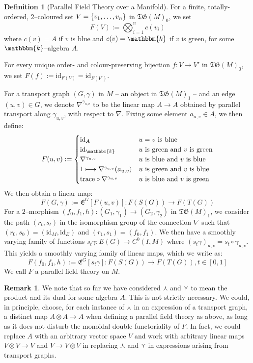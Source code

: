 \documentclass{amsart}
\newcommand{\K}{\mathbbm{k}}
\newcommand{\tensor}{\otimes}
\newcommand{\cwedge}{\curlywedge}
\newcommand{\cvee}{\curlyvee}
\renewcommand{\to}[1][]{\stackrel{#1}{\longrightarrow}}
\renewcommand{\mapsto}{\longmapsto}
\newcommand{\id}{\text{id}}
\newcommand{\br}[1]{\left( #1 \right)}
\newcommand{\curly}[1]{\left\{ #1 \right\}}
\newcommand{\set}[2][]{\ifthenelse{\equal{#1}{}}
                                  {\curly{#2}}
                                  {\curly{#1\ \textbf{:}\ #2}}}
\newcommand{\TG}{\mathfrak{TG}}
\newcommand{\Exp}[1]{\mathfrak{E}^{#1}}
\numberwithin{thm}{section}
\theoremstyle{definition}
\newtheorem{defn}[thm]{Definition}
\newtheorem{rmk}[thm]{Remark}
\begin{document}
\begin{defn}[Parallel Field Theory over a Manifold]\label{defn:sing_man_tqft}
For a finite, totally-ordered, $2$--coloured set
$V = \set{v_1, \dots, v_n}$ in $\TG(M)_0$, we set
\[
  F(V) := \bigotimes_{i = 1}^{n} c(v_i)
\]
where $c(v) = A$ if $v$ is blue and $c(v) = \K$ if $v$ is green,
for some $\K$--algebra $A$.

For every unique order- and colour-preserving bijection $f : V \to V'$ in
$\TG(M)_0$, we set $F(f) := \id_{F(V)} = \id_{F(V')}$.

For a transport graph $(G, \gamma)$ in $M$ -- an object in $\TG(M)_1$ -- and an
edge $(u, v) \in G$, we denote $\nabla^{\gamma_{u, v}}$ to be the linear map
$A \to A$ obtained by parallel transport along $\gamma_{u, v}$, with respect to
$\nabla$. Fixing some element $a_{u, v} \in A$, we then define:
\[
  F(u, v) := \begin{cases}
    \id_A
      & u = v \text{ is blue} \\
    \id_{\K} %
      & u \text{ is green and } v \text{ is green} \\
    \nabla^{\gamma_{u, v}}
      & u \text{ is blue and } v \text{ is blue} \\
    1 \mapsto \nabla^{\gamma_{u, v}}(a_{u, v})
      & u \text{ is green and } v \text{ is blue} \\
    \text{trace} \circ \nabla^{\gamma_{u, v}}
      & u \text{ is blue and } v \text{ is green}
  \end{cases}
\]
We then obtain a linear map:
\[
  F(G, \gamma) := \Exp{G}[F(u, v)]
               :  F(S(G)) \to F(T(G))
\]
For a $2$--morphism
$(f_0, f_1, h) : (G_1, \gamma_1) \to (G_2, \gamma_2)$ in $\TG(M)_1$, we consider
the path $(r_t, s_t)$ in the isomorphism group of the connection $\nabla$ such
that $(r_0, s_0) = (\id_M, \id_E)$ and $(r_1, s_1) = (f_0, f_1)$. We then have a
smoothly varying family of functions $s_t\gamma : E(G) \to C^0(I, M)$
where $(s_t\gamma)_{u, v} = s_t \circ \gamma_{u, v}$. This yields a smoothly
varying family of linear maps, which we write as:
\[
  F(f_0, f_1, h) := \Exp{G}[s_t\gamma]
    : F(S(G)) \to F(T(G)), t \in [0, 1]
\]
We call $F$ a parallel field theory on $M$.
\end{defn}

\begin{rmk}\label{rmk:any_vect_space}
We note that so far we have considered $\cwedge$ and $\cvee$ to mean the product
and its dual for some algebra $A$. This is not strictly necessary. We could, in
principle, choose, for each instance of $\cwedge$ in an expression of a
transport graph, a distinct map $A \tensor A \to A$ when defining a parallel
field theory as above, as long as it does not disturb the monoidal double
functoriality of $F$. In fact, we could replace $A$ with an arbitrary vector
space $V$ and work with arbitrary linear maps $V \tensor V \to V$ and
$V \to V \tensor V$ in replacing $\cwedge$ and $\cvee$ in expressions arising
from transport graphs.
\end{rmk}
\end{document}

